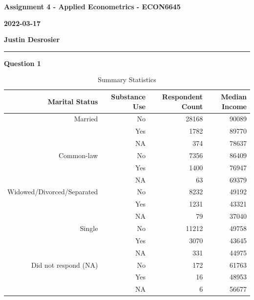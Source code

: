 \documentclass[11pt]{article}
\begin{document}


\textbf{Assignment 4 - Applied Econometrics - ECON6645}

\textbf{2022-03-17}

\textbf{Justin Desrosier}

\noindent\rule{16.51cm}{0.4pt}

\textbf{Question 1}

{
\begin{table}[!htbp]
\caption{Summary Statistics}
\centering
\def\sym#1{\ifmmode^{#1}\else\(^{#1}\)\fi}
  \begin{tabular}{rrrr}
    \hline
     Marital Status & Substance Use & Respondent Count & Median Income \\
    \hline
     Married &                   No & 28168 & 90089 \\
     &                           Yes & 1782 & 89770 \\
     &                           NA & 374 & 78637 \\
     \midrule
     Common-law &                No & 7356 & 86409 \\
     &                           Yes & 1400 & 76947 \\
     &                           NA &  63 & 69379 \\
     \midrule
     Widowed/Divorced/Separated& No & 8232 & 49192 \\
     &                           Yes & 1231 & 43321 \\
     &                           NA &  79 & 37040 \\
     \midrule
     Single &                    No & 11212 & 49758 \\
      &                          Yes & 3070 & 43645 \\
      &                          NA & 331 & 44975 \\
     \midrule
     Did not respond (NA) &      No & 172 & 61763 \\
       &                         Yes &  16 & 48953 \\
       &                         NA&6 & 56677 \\
     \hline
\end{tabular}
\end{table}
}
\end{document}
